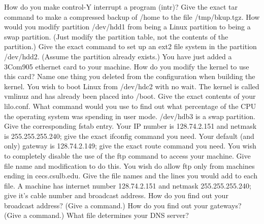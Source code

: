 \vskip 0.4in
\vfill\eject
\ques
How do you make control-Y interrupt a program ({\ltt{}intr})?
\vskip 0.4in
Give the exact tar command to make a compressed backup of {\ltt{}/home}
to the file {\ltt{}/tmp/bkup.tgz}.
\vskip 0.4in
\ques
How would you modify partition {\ltt{}/dev/hdd1} from being
a Linux partition to being a swap partition.
(Just modify the partition table, not the contents of the partition.)
\vskip 1.0in
Give the exact command to set up an {\ltt{}ext2} file system in the partition
{\ltt{}/dev/hdd2}. (Assume the partition already exists.)
\vskip 0.4in
\ques
You have just added a 3Com905 ethernet card to your machine.
How do you modify the kernel to use this card?
\vskip 1.5in
Name one thing you deleted from the configuration when building the kernel.
\vskip 0.4in
You wish to boot Linux from {\ltt{}/dev/hdc2} with no wait.
The kernel is called {\ltt{}vmlinuz} and has already been placed into
{\ltt{}/boot}.
Give the exact contents of your {\ltt{}lilo.conf}.
\vskip 1.8in
\vfill\eject
\ques
What command would you use to find out what percentage of the CPU the
operating system was spending in user mode.
\vskip 0.4in
{\ltt{}/dev/hdb3} is a swap partition.
Give the corresponding {\ltt{}fstab} entry.
\vskip 0.6in
\ques
Your IP number is {\ltt{}128.74.2.151} and netmask is {\ltt{}255.255.255.240};
give the exact {\ltt{}ifconfig} command you need.
\vskip 0.4in
Your default (and only) gateway is {\ltt{}128.74.2.149};
give the exact {\ltt{}route} command you need.
\vskip 0.4in
You wish to completely disable the use of the {\ltt{}ftp} command to
access your machine.
Give file name and modification to do this.
\vskip 0.8in
You wish do allow {\ltt{}ftp} only from machines ending in
{\ltt{}cecs.csulb.edu}.
Give the file names and the lines you would add to each file.
\vskip 1.6in
\ques
A machine has internet number {\ltt{}128.74.2.151} and
netmask {\ltt{}255.255.255.240};
give it's cable number and broadcast address.
\vskip 1.0in
How do you find out your broadcast address?
(Give a command.)
\vskip 0.4in
How do you find out your gateways?
(Give a command.)
\vskip 0.4in
What file determines your DNS server?
\vskip 0.4in
\bye

